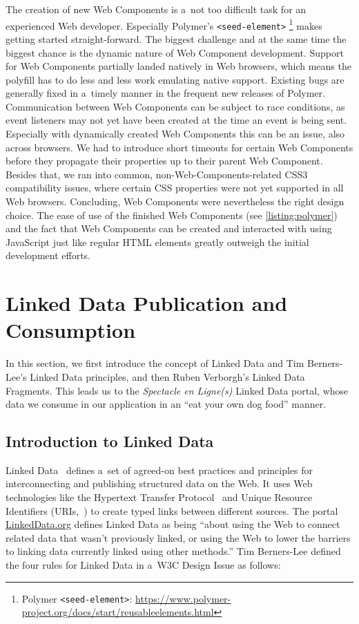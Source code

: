 \documentclass[runningheads,a4paper]{llncs}
\begin{document}
The creation of new Web Components is a~not too difficult task
for an experienced Web developer.
Especially Polymer's \texttt{<seed-element>}%
\footnote{Polymer \texttt{<seed-element>}:
\url{https://www.polymer-project.org/docs/start/reusableelements.html}}
makes getting started straight-forward.
The biggest challenge and at the same time the biggest chance
is the dynamic nature of Web Component development.
Support for Web Components partially landed natively in Web browsers,
which means the polyfill has to do less and less work emulating native support.
Existing bugs are generally fixed in a~timely manner in the frequent new releases of Polymer.
Communication between Web Components can be subject to race conditions,
as event listeners may not yet have been created at the time an event is being sent.
Especially with dynamically created Web Components this can be an issue,
also across browsers.
We had to introduce short timeouts for certain Web Components
before they propagate their properties up to their parent Web Component.
Besides that, we ran into common, non-Web-Components-related CSS3 compatibility issues,
where certain CSS properties were not yet supported in all Web browsers.
Concluding, Web Components were nevertheless the right design choice.
The ease of use of the finished Web Components (see \autoref{listing:polymer})
and the fact that Web Components can be created and interacted with using JavaScript
just like regular HTML elements greatly outweigh the initial development efforts.


\section{Linked Data Publication and Consumption}

In this section, we first introduce the concept of Linked Data
and Tim Berners-Lee's Linked Data principles,
and then Ruben Verborgh's Linked Data Fragments.
This leads us to the \emph{Spectacle en Ligne(s)} Linked Data portal,
whose data we consume in our application in an ``eat your own dog food'' manner.

\subsection{Introduction to Linked Data}

Linked Data~\cite{bernerslee2006linkeddata} defines a~set of agreed-on
best practices and principles for interconnecting and publishing structured data on the Web.
It uses Web technologies like the Hypertext Transfer Protocol~\cite{fielding1999http}
and Unique Resource Identifiers (URIs,~\cite{bernerslee2005uri})
to create typed links between different sources.
The portal \url{LinkedData.org} defines Linked Data as being
``about using the Web to connect related data that wasn't previously linked,
or using the Web to lower the barriers to linking data currently linked using other methods.''
Tim Berners-Lee defined the four rules for Linked Data in a~W3C Design Issue as follows:
\end{document}
